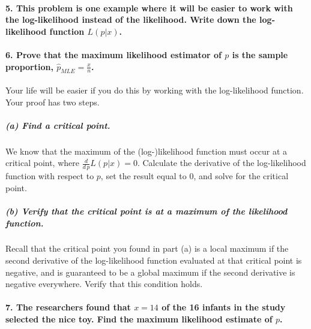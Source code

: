 \documentclass[]{article}
\let\oldparagraph\paragraph
\renewcommand{\paragraph}[1]{\oldparagraph{#1}\mbox{}}
\let\oldsubparagraph\subparagraph
\renewcommand{\subparagraph}[1]{\oldsubparagraph{#1}\mbox{}}
\begin{document}
\vspace{4cm}

\paragraph{\texorpdfstring{5. This problem is one example where it will
be easier to work with the log-likelihood instead of the likelihood.
Write down the log-likelihood function
\(L(p | x)\).}{5. This problem is one example where it will be easier to work with the log-likelihood instead of the likelihood. Write down the log-likelihood function L(p \textbar{} x).}}\label{this-problem-is-one-example-where-it-will-be-easier-to-work-with-the-log-likelihood-instead-of-the-likelihood.-write-down-the-log-likelihood-function-lp-x.}

\newpage

\paragraph{\texorpdfstring{6. Prove that the maximum likelihood
estimator of \(p\) is the sample proportion,
\(\hat{p}_{MLE} = \frac{x}{n}\).}{6. Prove that the maximum likelihood estimator of p is the sample proportion, \textbackslash{}hat\{p\}\_\{MLE\} = \textbackslash{}frac\{x\}\{n\}.}}\label{prove-that-the-maximum-likelihood-estimator-of-p-is-the-sample-proportion-hatp_mle-fracxn.}

Your life will be easier if you do this by working with the
log-likelihood function. Your proof has two steps.

\subparagraph{(a) Find a critical
point.}\label{a-find-a-critical-point.}

We know that the maximum of the (log-)likelihood function must occur at
a critical point, where \(\frac{d}{d \, p} L(p | x) = 0\). Calculate the
derivative of the log-likelihood function with respect to \(p\), set the
result equal to \(0\), and solve for the critical point.

\vspace{8cm}

\subparagraph{(b) Verify that the critical point is at a maximum of the
likelihood
function.}\label{b-verify-that-the-critical-point-is-at-a-maximum-of-the-likelihood-function.}

Recall that the critical point you found in part (a) is a local maximum
if the second derivative of the log-likelihood function evaluated at
that critical point is negative, and is guaranteed to be a global
maximum if the second derivative is negative everywhere. Verify that
this condition holds.

\newpage

\paragraph{\texorpdfstring{7. The researchers found that \(x=14\) of the
16 infants in the study selected the nice toy. Find the maximum
likelihood estimate of
\(p\).}{7. The researchers found that x=14 of the 16 infants in the study selected the nice toy. Find the maximum likelihood estimate of p.}}\label{the-researchers-found-that-x14-of-the-16-infants-in-the-study-selected-the-nice-toy.-find-the-maximum-likelihood-estimate-of-p.}
\end{document}
